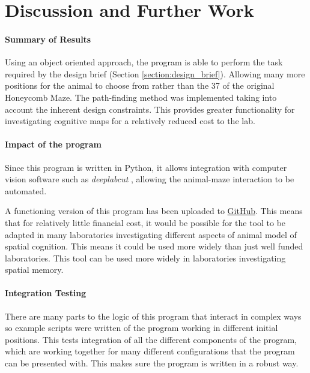 \section{Discussion and Further Work}

\paragraph{Summary of Results}

Using an object oriented approach, the program is able to perform the task required by the design brief (Section \ref{section:design_brief}). Allowing many more positions for the animal to choose from rather than the 37 of the original Honeycomb Maze. The path-finding method was implemented taking into account the inherent design constraints. This provides greater functionality for investigating cognitive maps for a relatively reduced cost to the lab.


\paragraph{Impact of the program}

Since this program is written in Python, it allows integration with computer vision software such as \textit{deeplabcut} \cite{dlc}, allowing the animal-maze interaction to be automated.

A functioning version of this program has been uploaded to \href{https://github.com/casualcoffeeaddict/Honeycomb-Maze}{GitHub}. This means that for relatively little financial cost, it would be possible for the tool to be adapted in many laboratories investigating different aspects of animal model of spatial cognition. This means it could be used more widely than just well funded laboratories. This tool can be used more widely in laboratories investigating spatial memory.  

\paragraph{Integration Testing}

There are many parts to the logic of this program that interact in complex ways so example scripts were written of the program working in different initial positions. This tests integration of all the different components of the program, which are working together for many different configurations that the program can be presented with. This makes sure the program is written in a robust way.


